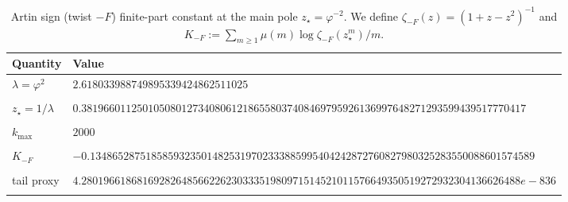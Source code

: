 \begin{table}[H]
\centering
\scriptsize
\setlength{\tabcolsep}{6pt}
\caption{Artin sign (twist $-F$) finite-part constant at the main pole $z_\star=\varphi^{-2}$. We define $\zeta_{-F}(z)=(1+z-z^2)^{-1}$ and $K_{-F}:=\sum_{m\ge 1}\mu(m)\log\zeta_{-F}(z_\star^m)/m$.}
\label{tab:real_input_40_artin_sign_mertens}
\begin{tabular}{l l}
\toprule
Quantity & Value\\
\midrule
$\lambda=\varphi^2$ & $2.618033988749895339424862511025$\\\\
$z_\star=1/\lambda$ & $0.38196601125010508012734080612186558037408469795926136997648271293599439517770417$\\\\
$k_{\max}$ & $2000$\\\\
$K_{-F}$ & $-0.13486528751858593235014825319702333885995404242872760827980325283550088601574589$\\\\
tail proxy & $4.2801966186816928264856622623033351980971514521011576649350519272932304136626488e-836$\\\\
\bottomrule
\end{tabular}
\end{table}
